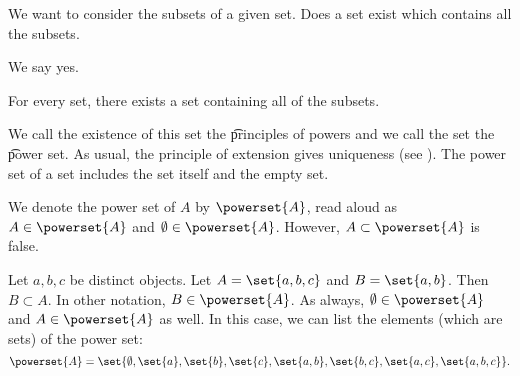 

We want to consider the subsets of a given set.
Does a set exist which contains all the subsets.


We say yes.

\begin{principle}[Powers]
	For every set, there exists a set containing all of the subsets.
\end{principle}

We call the existence of this set the \t{principles of powers} and we call the set the \t{power set}.
As usual, the principle of extension gives uniqueness (see ).
The power set of a set includes the set itself and the empty set.


We denote the power set of $A$ by $\powerset{A}$, read aloud as 
$A \in \powerset{A}$ and $\emptyset \in \powerset{A}$.
However, $A \subset \powerset{A}$ is false.


Let $a, b, c$ be distinct
objects. Let $A = \set{a, b ,c}$
and $B = \set{a, b}$. Then
$B \subset A$.
In other notation,
$B \in \powerset{A}$.
As always, $\emptyset \in \powerset{A}$
and $A \in \powerset{A}$ as well.
In this case, we can
list the elements (which are sets)
of the power set:
\[
  \powerset{A} = \set{
    \emptyset,
    \set{a},
    \set{b},
    \set{c},
    \set{a, b},
    \set{b, c},
    \set{a, c},
    \set{a, b, c}
  }.
\]

\blankpage
